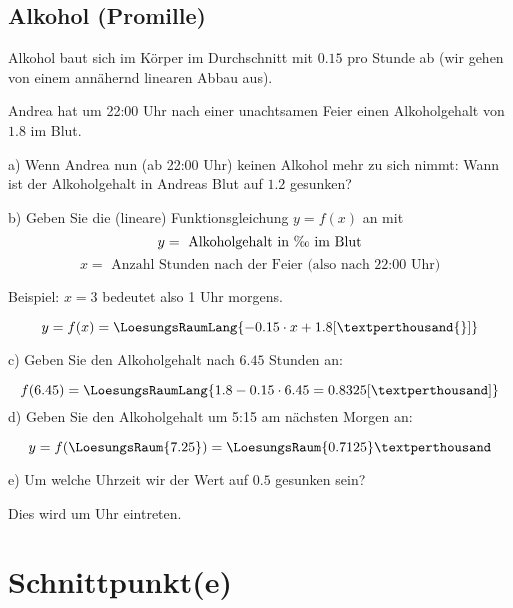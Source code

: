 \subsection{Alkohol (Promille)}
Alkohol baut sich im Körper im Durchschnitt mit
$0.15$\textperthousand{} pro Stunde ab (wir gehen von einem annähernd
linearen Abbau aus).

Andrea hat um 22:00 Uhr nach einer unachtsamen Feier einen
Alkoholgehalt von $1.8$\textperthousand{} im Blut.

a) Wenn Andrea nun (ab 22:00 Uhr) keinen Alkohol mehr zu sich nimmt:
Wann ist der Alkoholgehalt in Andreas Blut auf $1.2$\textperthousand{}
gesunken?


b) Geben Sie die (lineare) Funktionsgleichung $y=f(x)$ an mit
$$y = \text{ Alkoholgehalt in \textperthousand{} im Blut}$$
$$x = \text{ Anzahl Stunden nach der Feier (also nach 22:00 Uhr)}$$

Beispiel: $x=3$ bedeutet also 1 Uhr morgens.

$$y = f(x) = \LoesungsRaumLang{-0.15\cdot{}x + 1.8 [\text{\textperthousand{}}]}$$

c) Geben Sie den Alkoholgehalt nach $6.45$ Stunden an:

$$f(6.45) = \LoesungsRaumLang{1.8-0.15\cdot{}6.45 = 0.8325
[\text{\textperthousand}]}$$
\TNTeop{}
d) Geben Sie den Alkoholgehalt um 5:15 am nächsten Morgen an:

$$y = f(\LoesungsRaum{7.25}) = \LoesungsRaum{0.7125}\textperthousand$$


e) Um welche Uhrzeit wir der Wert auf $0.5$\textperthousand{} gesunken
sein?

\vspace{5mm}
Dies wird um  Uhr eintreten.

\section{Schnittpunkt(e)}
